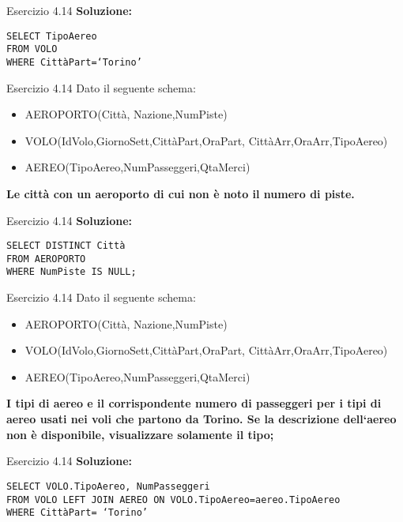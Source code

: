 \begin{frame}{Esercizio 4.14}
    \textbf{Soluzione:}
    \vspace{1em}
    
    \texttt{SELECT TipoAereo\\FROM VOLO\\WHERE Citt\`aPart=`Torino'}
    \end{frame}
\begin{frame}{Esercizio 4.14}
    Dato il seguente schema:
    \begin{itemize}
        \item AEROPORTO(Citt\`a, Nazione,NumPiste)
        \item VOLO(IdVolo,GiornoSett,Citt\`aPart,OraPart,
        Citt\`aArr,OraArr,TipoAereo)
        \item AEREO(TipoAereo,NumPasseggeri,QtaMerci)
    \end{itemize}
    \vspace{1em}
    
    \textbf{Le citt\`a con un aeroporto di cui non \`e noto il numero di piste.}
\end{frame}

\begin{frame}{Esercizio 4.14}
    \textbf{Soluzione:}
    \vspace{1em}
    
    \texttt{SELECT DISTINCT Citt\`a\\FROM AEROPORTO\\WHERE NumPiste IS NULL;}
    \end{frame}
\begin{frame}{Esercizio 4.14}
    Dato il seguente schema:
    \begin{itemize}
        \item AEROPORTO(Citt\`a, Nazione,NumPiste)
        \item VOLO(IdVolo,GiornoSett,Citt\`aPart,OraPart,
        Citt\`aArr,OraArr,TipoAereo)
        \item AEREO(TipoAereo,NumPasseggeri,QtaMerci)
    \end{itemize}
    \vspace{1em}
    
    \textbf{I tipi di aereo e il corrispondente numero di passeggeri per i tipi di aereo usati nei voli che partono da Torino. Se la descrizione dell`aereo non \`e disponibile, visualizzare solamente il tipo;}
\end{frame}

\begin{frame}{Esercizio 4.14}
    \textbf{Soluzione:}
    \vspace{1em}
    
    \texttt{SELECT VOLO.TipoAereo, NumPasseggeri\\FROM VOLO LEFT JOIN AEREO ON VOLO.TipoAereo=aereo.TipoAereo\\WHERE Citt\`aPart= `Torino'}
    \end{frame}
